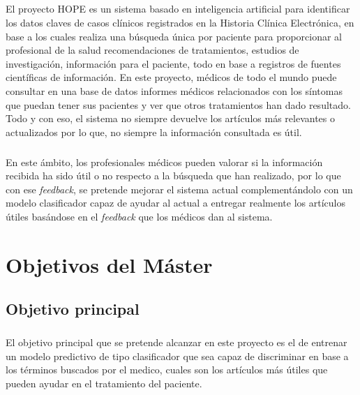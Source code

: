 \documentclass[10pt,a4paper,oneside]{book}
\begin{document}
\paragraph{}
El proyecto HOPE es un sistema basado en inteligencia artificial para identificar los datos claves de casos clínicos registrados en la Historia Clínica Electrónica, en base a los cuales realiza una búsqueda única por paciente para proporcionar al profesional de la salud recomendaciones de tratamientos, estudios de investigación, información para el paciente, todo en base a registros de fuentes científicas de información. En este proyecto, médicos de todo el mundo puede consultar en una base de datos informes médicos relacionados con los síntomas que puedan tener sus pacientes y ver que otros tratamientos han dado resultado. Todo y con eso, el sistema no siempre devuelve los artículos más relevantes o actualizados por lo que, no siempre la información consultada es útil.

\paragraph{}
En este ámbito, los profesionales médicos pueden valorar si la información recibida ha sido útil o no respecto a la búsqueda que han realizado, por lo que con ese \textit{feedback}, se pretende mejorar el sistema actual complementándolo con un modelo clasificador capaz de ayudar al actual a entregar realmente los artículos útiles basándose en el \textit{feedback} que los médicos dan al sistema.

\chapter{Objetivos del Máster}

\section{Objetivo principal}

\paragraph{}
El objetivo principal que se pretende alcanzar en este proyecto es el de entrenar un modelo predictivo de tipo clasificador que sea capaz de discriminar en base a los términos buscados por el medico, cuales son los artículos más útiles que pueden ayudar en el tratamiento del paciente.
\end{document}
